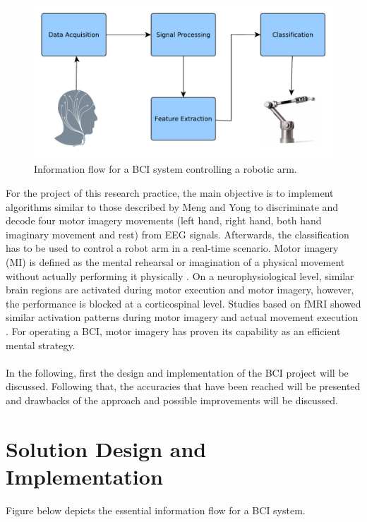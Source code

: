 \documentclass[a4paper,twoside, openright,12pt]{report}
\begin{document}
\begin{figure}[htbp]
	\centering
	\includegraphics[width=0.8\linewidth]{./gfx/BCI_control_system.pdf}
	\caption{Information flow for a BCI system controlling a robotic arm.}
	\label{fig:bci_control_system}
\end{figure}
For the project of this research practice, the main objective is to implement algorithms similar to those described by Meng and Yong \cite{meng2016noninvasive,yong2015eeg} to discriminate and decode four motor imagery movements (left hand, right hand, both hand imaginary movement and
rest) from EEG signals. Afterwards, the classification has to be used to control a robot arm in a real-time scenario. Motor imagery (MI) is defined as the mental rehearsal or imagination of a physical movement without actually performing it physically \cite{decety1996neurophysiological}. On a neurophysiological level, similar brain regions are activated during motor execution and motor imagery, however, the performance is blocked at a corticospinal level. Studies based on fMRI showed similar activation patterns during motor imagery and actual movement execution \cite{lotze1999activation}. For operating a BCI, motor imagery has proven its capability as an efficient mental strategy. \\ \\



In the following, first the design and implementation of the BCI project will be discussed. Following that, the accuracies that have been reached will be presented and drawbacks of the approach and possible improvements will be discussed.







\chapter{Solution Design and Implementation}
Figure below depicts the essential information flow for a BCI system. 
\end{document}
